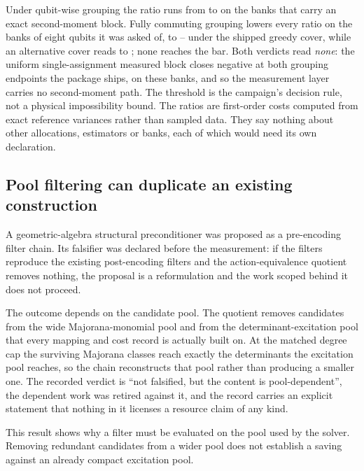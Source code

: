 \documentclass[aps,pra,reprint,superscriptaddress,nofootinbib,floatfix,
  showkeys]{revtex4-2}
\begin{document}
Under qubit-wise grouping the ratio runs from \cqcResidualQWCMin{} to
\cqcResidualQWCMax{} on the \cqcResidualQWCBanks{} banks that carry an exact
second-moment block.  Fully commuting grouping lowers every ratio on the
\cqcResidualFCBanks{} banks of eight qubits it was asked of, to
\cqcResidualFCMin{}--\cqcResidualFCMax{} under the shipped greedy cover, while
an alternative cover reads \cqcResidualFCAltMin{} to \cqcResidualFCAltMax{};
none reaches the bar.  Both verdicts read \emph{none}: the uniform
single-assignment measured block closes negative at both grouping endpoints the
package ships, on these banks, and so the measurement layer carries no
second-moment path. The threshold is the campaign's decision rule, not a
physical impossibility bound. The ratios are first-order costs computed from exact
reference variances rather than sampled data.  They say nothing about other
allocations, estimators or banks, each of which would need its own declaration.

\subsection{Pool filtering can duplicate an existing construction}

A geometric-algebra structural preconditioner was proposed as a pre-encoding
filter chain.  Its falsifier was declared before the measurement: if the filters
reproduce the existing post-encoding filters and the action-equivalence quotient
removes nothing, the proposal is a reformulation and the work scoped behind it
does not proceed.

The outcome depends on the candidate pool.  The quotient removes \cqcGOneMajorana{}
candidates from the wide Majorana-monomial pool and \cqcGOneExcitation{} from
the determinant-excitation pool that every mapping and cost record is actually
built on.  At the matched degree cap the surviving Majorana classes reach
exactly the determinants the excitation pool reaches, so the chain reconstructs
that pool rather than producing a smaller one.  The recorded verdict is ``not
falsified, but the content is pool-dependent'', the dependent work was retired
against it, and the record carries an explicit statement that nothing in it
licenses a resource claim of any kind.

This result shows why a filter must be evaluated on the pool used by the
solver. Removing redundant candidates from a wider pool does not establish a
saving against an already compact excitation pool.
\end{document}
